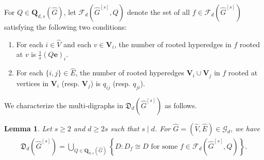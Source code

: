 \documentclass{article}
\newtheorem{lem}[thm]{Lemma}
\begin{document}
For $Q \in \mathbf{Q}_{d,s}(\widehat{G})$,
let $\mathcal{F}_{d}(\widehat{G}^{[s]},Q)$ denote the set of all $f \in \mathcal{F}_{d}(\widehat{G}^{[s]})$ satisfying the following two conditions:
\begin{enumerate}

\item[(i)] For each $i \in \widehat{V}$ and each $v \in \mathbf{V}_{i}$,
the number of rooted hyperedges in $f$ rooted at $v$ is $\frac{1}{s}(Q\mathbf{e})_{i}$.

\item[(ii)] For each $\{i,j\} \in \widehat{E}$,
the number of rooted hyperedges $\mathbf{V}_{i} \cup \mathbf{V}_{j}$ in $f$ rooted at vertices in $\mathbf{V}_{i}$ (resp. $\mathbf{V}_{j}$) is $q_{ij}$ (resp. $q_{ji}$).
\end{enumerate}
We characterize the multi-digraphs in $\mathfrak{D}_{d}(\widehat{G}^{[s]})$ as follows.

\begin{lem}\label{yinli4}
Let $s \geq 2$ and $d \geq 2s$ such that $s \mid d$.
For $\widehat{G} = (\widehat{V},\widehat{E}) \in \mathcal{G}_{d}$,
we have
\begin{align*}
\mathfrak{D}_{d}(\widehat{G}^{[s]})=
\bigcup_{Q \in \mathbf{Q}_{d,s}(\widehat{G})}\left\{ D : \mbox{$D_{f} \cong D$ for some $f \in \mathcal{F}_{d}(\widehat{G}^{[s]},Q)$} \right\}.
\end{align*}
\end{lem}
\end{document}
